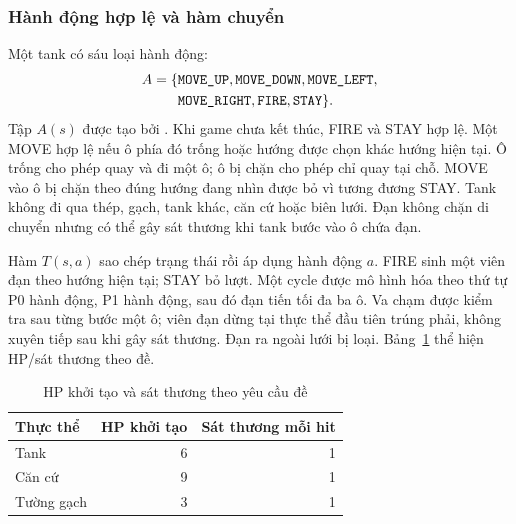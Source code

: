 \subsubsection{Hành động hợp lệ và hàm chuyển}
Một tank có sáu loại hành động:
\begin{equation}
\begin{split}
A=\{&\texttt{MOVE\_UP},\texttt{MOVE\_DOWN},\texttt{MOVE\_LEFT},\\
&\texttt{MOVE\_RIGHT},\texttt{FIRE},\texttt{STAY}\}.
\end{split}
\end{equation}
Tập $A(s)$ được tạo bởi . Khi game chưa kết thúc,
FIRE và STAY hợp lệ. Một MOVE hợp lệ nếu ô phía đó trống hoặc hướng
được chọn khác hướng hiện tại. Ô trống cho phép quay và đi một ô; ô
bị chặn cho phép chỉ quay tại chỗ. MOVE vào ô bị chặn theo đúng hướng
đang nhìn được bỏ vì tương đương STAY. Tank không đi qua thép, gạch,
tank khác, căn cứ hoặc biên lưới. Đạn không chặn di chuyển nhưng có
thể gây sát thương khi tank bước vào ô chứa đạn.

Hàm $T(s,a)$ sao chép trạng thái rồi áp dụng hành động $a$. FIRE sinh
một viên đạn theo hướng hiện tại; STAY bỏ lượt. Một cycle được mô hình
hóa theo thứ tự P0 hành động, P1 hành động, sau đó đạn tiến tối đa ba ô.
Va chạm được kiểm tra sau từng bước một ô; viên đạn dừng tại thực thể
đầu tiên trúng phải, không xuyên tiếp sau khi gây sát thương. Đạn ra
ngoài lưới bị loại. Bảng~\ref{t2:tab:hp} thể hiện HP/sát thương theo đề.

\begin{table}[t]
\caption{HP khởi tạo và sát thương theo yêu cầu đề}
\label{t2:tab:hp}
\centering
\begin{tabular}{lrr}
\toprule
Thực thể & HP khởi tạo & Sát thương mỗi hit\\
\midrule
Tank & 6 & 1\\
Căn cứ & 9 & 1\\
Tường gạch & 3 & 1\\
\bottomrule
\end{tabular}
\end{table}

